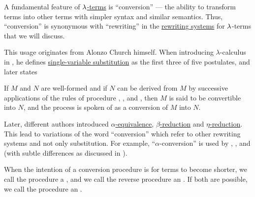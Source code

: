 \begin{concept}\label{con:lambda_conversion}
  A fundamental feature of \hyperref[def:lambda_term]{\( {\mathrm \lambda} \)-terms} is \enquote{conversion} --- the ability to transform terms into other terms with simpler syntax and similar semantics. Thus, \enquote{conversion} is synonymous with \enquote{rewriting} in the \hyperref[def:rewriting_system]{rewriting systems} for \( {\mathrm \lambda} \)-terms that we will discuss.

  This usage originates from Alonzo Church himself. When introducing \( \lambda \)-calculus in \cite[357]{Church1932LambdaCalculus}, he defines \hyperref[def:lambda_term_substitution]{single-variable substitution} as the first three of five postulates, and later states
  \begin{displayquote}
    If \( M \) and \( N \) are well-formed and if \( N \) can be derived from \( M \) by successive applications of the rules of procedure , , and , then \( M \) is said to be convertible into \( N \), and the process is spoken of as a conversion of \( M \) into \( N \).
  \end{displayquote}

  Later, different authors introduced \hyperref[def:lambda_term_alpha_equivalence]{\( \alpha \)-equivalence}, \hyperref[def:beta_eta_reduction]{\( \beta \)-reduction} and \hyperref[def:beta_eta_reduction]{\( \eta \)-reduction}. This lead to variations of the word \enquote{conversion} which refer to other rewriting systems and not only substitution. For example, \enquote{\( \alpha \)-conversion} is used by , ,  and  (with subtle differences as discussed in ).

  When the intention of a conversion procedure is for terms to become shorter, we call the procedure a , and we call the reverse procedure an . If both are possible, we call the procedure an .
\end{concept}

